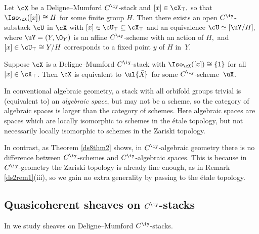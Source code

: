 \documentclass{article}
\begin{document}
\begin{prop} Let\/ $\cX$ be a Deligne--Mumford\/ $C^\iy$-stack and\/
$[x]\in\cX_\top,$ so that\/ $\Iso_\cX([x])\cong
H$ for some
finite group $H$. Then there exists an open $C^\iy$-substack\/ $\cU$
in $\cX$ with\/ $[x]\in\cU_\top\subseteq\cX_\top$ and an
equivalence\/ $\cU\simeq[\uY/H],$ where $\uY=(Y,\O_Y)$ is an affine
$C^\iy$-scheme with an action of\/ $H,$ and\/ $[x]\in\cU_\top\cong
Y/H$ corresponds to a fixed point\/ $y$ of\/ $H$ in\/~$Y$.
\label{ds8prop4}
\end{prop}

\begin{thm} Suppose $\cX$ is a Deligne--Mumford\/ $C^\iy$-stack
with\/ $\Iso_\cX([x])\cong\{1\}$ for all\/ $[x]\in\cX_\top$. Then\/
$\cX$ is equivalent to\/ $\ul{\bar X\!}\,$ for some\/
$C^\iy$-scheme\/~$\uX$.
\label{ds8thm2}
\end{thm}

In conventional algebraic geometry, a stack with all orbifold groups
trivial is (equivalent to) an {\it algebraic space}, but may not be a scheme, so the category of algebraic spaces
is larger than the category of schemes. Here algebraic spaces are
spaces which are locally isomorphic to schemes in the \'etale
topology, but not necessarily
locally isomorphic to schemes in the Zariski topology.

In contrast, as Theorem \ref{ds8thm2} shows, in $C^\iy$-algebraic
geometry there is no difference between $C^\iy$-schemes and
$C^\iy$-algebraic spaces. This is because in $C^\iy$-geometry the
Zariski topology is already fine enough, as in Remark
\ref{ds2rem1}(iii), so we gain no extra generality by passing to the
\'etale topology.

\subsection{Quasicoherent sheaves on $C^\iy$-stacks}
\label{ds86}

In \cite[\S 10]{Joyc4} we study sheaves on Deligne--Mumford
$C^\iy$-stacks.
\end{document}
